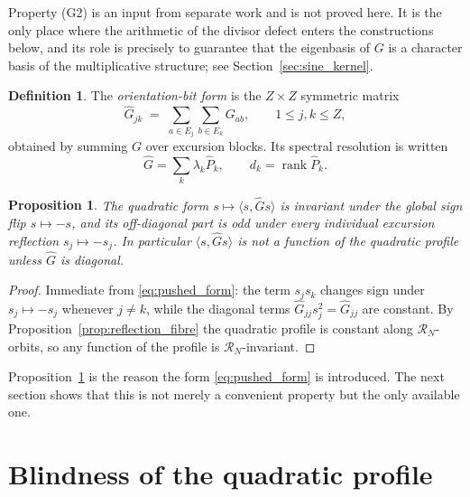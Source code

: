 \documentclass[11pt]{amsart}
\numberwithin{equation}{section}
\theoremstyle{plain}
\newtheorem{proposition}[theorem]{Proposition}
\theoremstyle{definition}
\newtheorem{definition}[theorem]{Definition}
\theoremstyle{remark}
\DeclareMathOperator{\rank}{rank}
\begin{document}
Property (G2) is an input from separate work and is not proved here. It
is the only place where the arithmetic of the divisor defect enters the
constructions below, and its role is precisely to guarantee that the
eigenbasis of $G$ is a character basis of the multiplicative structure;
see Section~\ref{sec:sine_kernel}.

\begin{definition}
\label{def:pushed_form}
The \emph{orientation-bit form} is the $Z \times Z$ symmetric matrix
\begin{equation}
\widehat{G}_{jk} \;=\; \sum_{a \in E_j} \sum_{b \in E_k} G_{ab},
\qquad 1 \le j,k \le Z,
\label{eq:pushed_form}
\end{equation}
obtained by summing $G$ over excursion blocks. Its spectral resolution
is written
\begin{equation}
\widehat{G} = \sum_{k} \lambda_k \widehat{P}_k,
\qquad d_k = \rank \widehat{P}_k .
\label{eq:pushed_spectral}
\end{equation}
\end{definition}

\begin{proposition}
\label{prop:pushed_form_odd}
The quadratic form $s \mapsto \langle s, \widehat{G} s\rangle$ is
invariant under the global sign flip $s \mapsto -s$, and its
off-diagonal part is odd under every individual excursion reflection
$s_j \mapsto -s_j$. In particular
$\langle s, \widehat{G} s\rangle$ is not a function of the quadratic
profile unless $\widehat{G}$ is diagonal.
\end{proposition}

\begin{proof}
Immediate from \eqref{eq:pushed_form}: the term $s_j s_k$ changes sign
under $s_j \mapsto -s_j$ whenever $j \neq k$, while the diagonal terms
$\widehat{G}_{jj} s_j^2 = \widehat{G}_{jj}$ are constant. By
Proposition~\ref{prop:reflection_fibre} the quadratic profile is
constant along $\mathcal{R}_N$-orbits, so any function of the profile
is $\mathcal{R}_N$-invariant.
\end{proof}

Proposition~\ref{prop:pushed_form_odd} is the reason the form
\eqref{eq:pushed_form} is introduced. The next section shows that this
is not merely a convenient property but the only available one.

\section{Blindness of the quadratic profile}
\label{sec:blindness}
\end{document}
